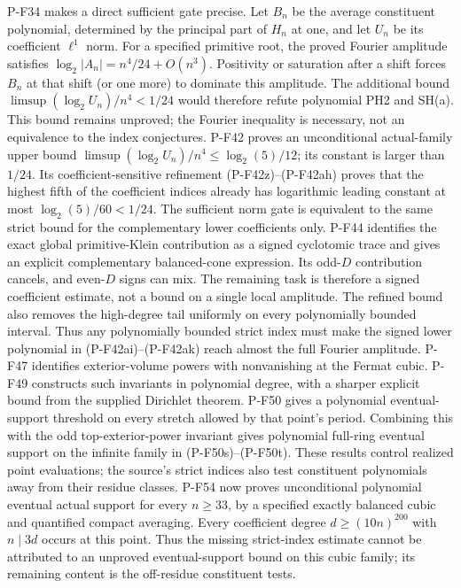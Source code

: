 \begin{description}
P-F34 makes a direct sufficient gate precise. Let $B_n$ be the
average constituent polynomial, determined by the principal part
of $H_n$ at one, and let $U_n$ be its coefficient $\ell^1$ norm.
For a specified primitive root, the proved Fourier amplitude satisfies
$\log_2|A_n|=n^4/24+O(n^3)$. Positivity or saturation
after a shift forces $B_n$ at that shift (or one more) to dominate
this amplitude. The additional bound
$\limsup (\log_2 U_n)/n^4<1/24$ would therefore refute polynomial
PH2 and SH(a). This bound remains unproved; the Fourier inequality
is necessary, not an equivalence to the index conjectures.
P-F42 proves an unconditional actual-family upper bound
$\limsup(\log_2 U_n)/n^4\le\log_2(5)/12$; its constant
is larger than $1/24$. Its coefficient-sensitive refinement
(P-F42z)--(P-F42ah) proves that the highest fifth of the
coefficient indices already has logarithmic leading constant
at most $\log_2(5)/60<1/24$. The sufficient norm gate is
equivalent to the same strict bound for the complementary
lower coefficients only. P-F44 identifies the exact global
primitive-Klein contribution as a signed cyclotomic trace and
gives an explicit complementary balanced-cone expression.
Its odd-$D$ contribution cancels, and even-$D$ signs can mix.
The remaining task is therefore a signed coefficient estimate,
not a bound on a single local amplitude.
The refined bound also removes the high-degree tail uniformly
on every polynomially bounded interval. Thus any polynomially
bounded strict index must make the signed lower polynomial in
(P-F42ai)--(P-F42ak) reach almost the full Fourier amplitude.
P-F47 identifies exterior-volume powers with nonvanishing at the
Fermat cubic. P-F49 constructs such invariants in polynomial
degree, with a sharper explicit bound from the supplied Dirichlet
theorem. P-F50 gives a polynomial eventual-support threshold on
every stretch allowed by that point's period. Combining this
with the odd top-exterior-power invariant gives polynomial
full-ring eventual support on the infinite family in
(P-F50s)--(P-F50t). These results
control realized point evaluations; the source's strict indices
also test constituent polynomials away from their residue classes.
P-F54 now proves unconditional polynomial eventual actual support
for every $n\ge33$, by a specified exactly balanced cubic and
quantified compact averaging. Every coefficient degree
$d\ge(10n)^{200}$ with $n\mid3d$ occurs at this point. Thus
the missing strict-index estimate cannot be attributed to an
unproved eventual-support bound on this cubic family; its
remaining content is the off-residue constituent tests.

\end{description}
